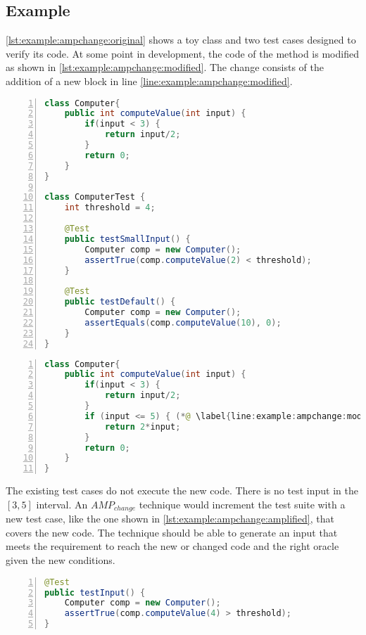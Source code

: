 \subsection{Example}
\label{subsec:sota:category-2:example}

\autoref{lst:example:ampchange:original} shows a toy class and two test cases designed to verify its code.
At some point in development, the code of the method is modified as shown in \autoref{lst:example:ampchange:modified}. 
The change consists of the addition of a new block in line \ref{line:example:ampchange:modified}. 

\begin{lstlisting}[caption={Initial version of a class and two test cases},label=lst:example:ampchange:original,float,language=java,numbers=left]
class Computer{
	public int computeValue(int input) {
		if(input < 3) {
			return input/2;
		}
		return 0;
	}
}

class ComputerTest {
	int threshold = 4;

	@Test
	public testSmallInput() {
		Computer comp = new Computer();
		assertTrue(comp.computeValue(2) < threshold);
	}

	@Test
	public testDefault() {
		Computer comp = new Computer();
		assertEquals(comp.computeValue(10), 0);
	}
}
\end{lstlisting}

\begin{lstlisting}[caption={Modified version of the initial class},label=lst:example:ampchange:modified,float,language=java,numbers=left]
class Computer{
	public int computeValue(int input) {
		if(input < 3) {
			return input/2;
		}
		if (input <= 5) { (*@ \label{line:example:ampchange:modified} @*)
			return 2*input;
		}
		return 0;
	}
}
\end{lstlisting}

The existing test cases do not execute the new code.
There is no test input in the $[3,5]$ interval. 
An $AMP_{change}$ technique would increment the test suite with a new test case, like the one shown in \autoref{lst:example:ampchange:amplified}, that covers the new code. 
The technique should be able to generate an input that meets the requirement to reach the new or changed code and the right oracle given the new conditions. 

\begin{lstlisting}[caption={A test case that covers the new portion of  code.},label=lst:example:ampchange:amplified,float,language=java,numbers=left]
@Test
public testInput() {
	Computer comp = new Computer();
	assertTrue(comp.computeValue(4) > threshold);
}
\end{lstlisting}
